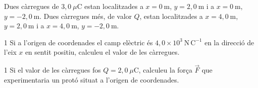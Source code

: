 Dues càrregues de $3,0\ \mu\mathrm{C}$ estan localitzades a $x = 0\ \mathrm{m}$, $y = 2,0\ \mathrm{m}$ i a $x = 0\ \mathrm{m}$, $y = -2,0\ \mathrm{m}$. Dues càrregues més, de valor $Q$, estan localitzades a $x = 4,0\ \mathrm{m}$, $y = 2,0\ \mathrm{m}$ i a $x = 4,0\ \mathrm{m}$, $y = -2,0\ \mathrm{m}$.

\begin{apartat}{1}
Si a l'origen de coordenades el camp elèctric és $4,0\times 10^{3}\ \mathrm{N\,C^{-1}}$ en la direcció de l'eix $x$ en sentit positiu, calculeu el valor de les càrregues.
\end{apartat}

\begin{apartat}{1}
Si el valor de les càrregues fos $Q = 2,0\ \mu\mathrm{C}$, calculeu la força $\vec{F}$ que experimentaria un protó situat a l'origen de coordenades.
\end{apartat}

